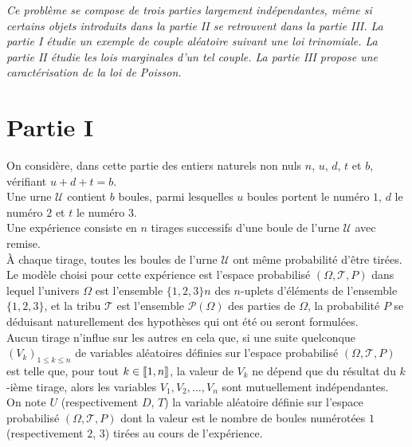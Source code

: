 \documentclass[11pt]{article}%
\begin{document}
\textsl{Ce problème se compose de trois parties largement
indépendantes,
même si certains objets introduits dans la partie II se retrouvent dans
la
partie III. La partie I étudie un exemple de couple aléatoire suivant
une loi trinomiale. La partie II étudie les lois marginales d'un tel
couple. La partie III propose une caractérisation de la loi de
Poisson.}

\section*{Partie I}

On considère, dans cette partie des entiers naturels non nuls $n$, $u$,
$d$, 
$t$ et $b$, vérifiant $u + d + t = b$.\\
Une urne $\mathcal{U}$ contient $b$ boules, parmi lesquelles $u$ boules
portent le numéro $1$, $d$ le numéro $2$ et $t$ le numéro $3$.\\
Une expérience consiste en $n$ tirages successifs d'une boule de l'urne
$\mathcal{U}$ avec remise.\\
{À} chaque tirage, toutes les boules de l'urne $\mathcal{U}$ ont même
probabilité d'être tirées.\\
Le modèle choisi pour cette expérience est l'espace probabilisé
$(\Omega,\mathcal{T},P)$ dans lequel l'univers $\Omega $ est l'ensemble
$\{1,2,3\}{n} $ des $n$-uplets d'éléments de l'ensemble $\{1,2,3\}$, et
la
tribu $\mathcal{T}$ est l'ensemble $\mathcal{P}(\Omega )$ des parties
de $\Omega $, la probabilité $P$ se déduisant naturellement des
hypothèses qui
ont été ou seront formulées.\\
Aucun tirage n'influe sur les autres en cela que, si une suite
quelconque $(V_{k})_{1\leq k\leq n}$ de variables aléatoires définies
sur
l'espace probabilisé $(\Omega,\mathcal{T},P)$ est telle que, pour tout
$k\in \lbrack \hspace{-0.15em}[1,n]\hspace{-0.13em}]$, la valeur de
$V_{k}$
ne dépend que du résultat du $k$-ième tirage, alors les variables
$V_{1},V_{2},...,V_{n}$ sont mutuellement indépendantes.\\
On note $U$ (respectivement $D$, $T$) la variable aléatoire définie sur
l'espace probabilisé $(\Omega,\mathcal{T},P)$ dont la valeur est le
nombre
de boules numérotées $1$ (respectivement $2$, $3$) tirées au cours de
l'expérience.
\end{document}
